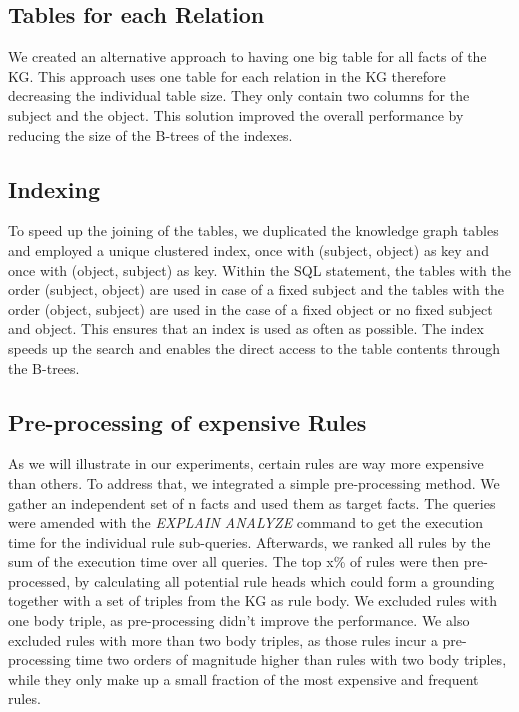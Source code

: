 \documentclass[english]{lni}
\begin{document}
\subsection{Tables for each Relation}
We created an alternative approach to having one big table for all facts of the KG. This approach uses one table for each relation in the KG therefore decreasing the individual table size. They only contain two columns for the subject and the object. This solution improved the overall performance by reducing the size of the B-trees of the indexes.

\subsection{Indexing}
To speed up the joining of the tables, we duplicated the knowledge graph tables and employed a unique clustered index, once with (subject, object) as key and once with (object, subject) as key. Within the SQL statement, the tables with the order (subject, object) are used in case of a fixed subject and the tables with the order (object, subject) are used in the case of a fixed object or no fixed subject and object. This ensures that an index is used as often as possible. The index speeds up the search and enables the direct access to the table contents through the B-trees.

\subsection{Pre-processing of expensive Rules}
As we will illustrate in our experiments, certain rules are way more expensive than others. To address that, we integrated a simple pre-processing method. We gather an independent set of n facts and used them as target facts. The queries were amended with the \textit{EXPLAIN ANALYZE} command to get the execution time for the individual rule sub-queries. Afterwards, we ranked all rules by the sum of the execution time over all queries. The top x\% of rules were then pre-processed, by calculating all potential rule heads which could form a grounding together with a set of triples from the KG as rule body. We excluded rules with one body triple, as pre-processing didn’t improve the performance. We also excluded rules with more than two body triples, as those rules incur a pre-processing time two orders of magnitude higher than rules with two body triples, while they only make up a small fraction of the most expensive and frequent rules.
\end{document}
